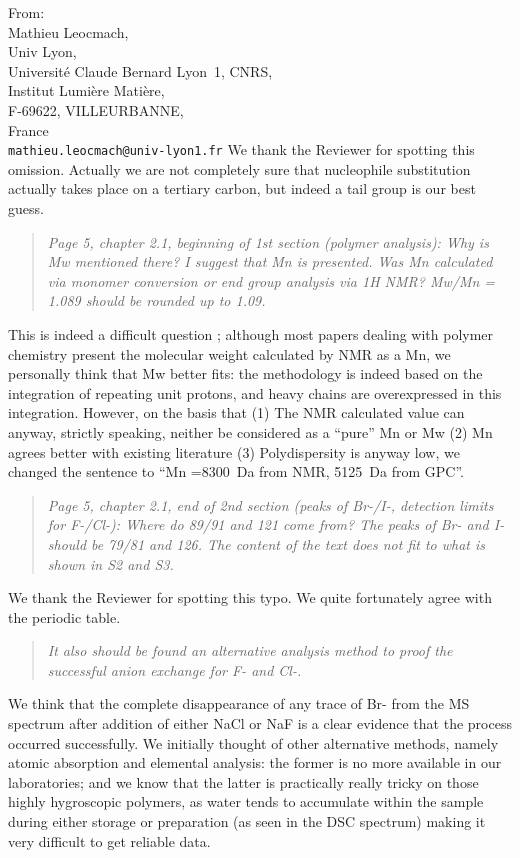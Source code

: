 \documentclass[a4paper, parskip=true, firsthead=false, fromemail=true, foldmarks=false]{scrlttr2}
\newenvironment{quotationi}
{\begin{quotation}\itshape}
{\end{quotation}}
\begin{document}
\begin{letter}{From:\\
Mathieu Leocmach,\\
Univ Lyon,\\ 
Universit\'e Claude Bernard Lyon~1, CNRS,\\
Institut Lumi\`ere Mati\`ere,\\
F-69622, VILLEURBANNE,\\
France\\
\texttt{mathieu.leocmach@univ-lyon1.fr}
}
We thank the Reviewer for spotting this omission. Actually we are not completely sure that nucleophile substitution actually takes place on a tertiary carbon, but indeed a  tail group is our best guess.

\begin{quotationi}
Page 5, chapter 2.1, beginning of 1st section (polymer analysis): Why is Mw mentioned there? I suggest that Mn is presented. Was Mn calculated via monomer conversion or end group analysis via 1H NMR? Mw/Mn = 1.089 should be rounded up to 1.09.
\end{quotationi}

This is indeed a difficult question ; although most papers dealing with polymer chemistry present the molecular weight calculated by NMR as a Mn, we personally think that Mw better fits: the methodology is indeed based on the integration of repeating unit protons, and heavy chains are overexpressed in this integration. However, on the basis that (1) The NMR calculated value can anyway, strictly speaking, neither be considered as a ``pure''  Mn or Mw (2) Mn agrees better with existing literature (3) Polydispersity is anyway low, we changed the sentence to ``Mn =\SI{8300}{\dalton} from NMR, \SI{5125}{\dalton} from GPC''.


\begin{quotationi}
Page 5, chapter 2.1, end of 2nd section (peaks of Br-/I-, detection limits for F-/Cl-): Where do 89/91 and 121 come from? The peaks of Br- and I- should be 79/81 and 126. The content of the text does not fit to what is shown in S2 and S3.
\end{quotationi}
We thank the Reviewer for spotting this typo. We quite fortunately agree with the periodic table.

\begin{quotationi}
 It also should be found an alternative analysis method to proof the successful anion exchange for F- and Cl-.
\end{quotationi}
We think that the complete disappearance of any trace of Br- from the MS spectrum after addition of either NaCl or NaF is a clear evidence that the process occurred successfully. We initially thought of other alternative methods, namely atomic absorption  and elemental analysis: the former is no more available in our laboratories; and we know that the latter is practically really tricky on those highly hygroscopic polymers, as water tends to accumulate within the sample during either storage or preparation (as seen in the DSC spectrum) making it very difficult to get reliable data.


\end{letter}
\end{document}

